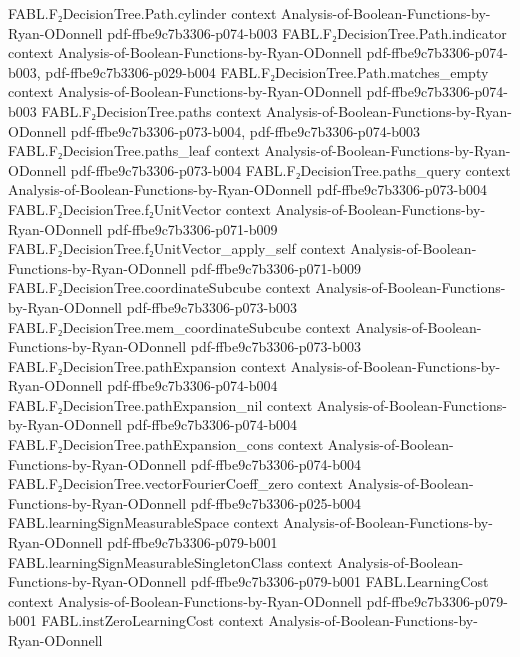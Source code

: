 \begin{theorem}
\proofstep
  {FABL.F₂DecisionTree.Path.cylinder}
  {context}
  {Analysis-of-Boolean-Functions-by-Ryan-ODonnell}
  {pdf-ffbe9c7b3306-p074-b003}
\proofstep
  {FABL.F₂DecisionTree.Path.indicator}
  {context}
  {Analysis-of-Boolean-Functions-by-Ryan-ODonnell}
  {pdf-ffbe9c7b3306-p074-b003,
    pdf-ffbe9c7b3306-p029-b004}
\proofstep
  {FABL.F₂DecisionTree.Path.matches_empty}
  {context}
  {Analysis-of-Boolean-Functions-by-Ryan-ODonnell}
  {pdf-ffbe9c7b3306-p074-b003}
\proofstep
  {FABL.F₂DecisionTree.paths}
  {context}
  {Analysis-of-Boolean-Functions-by-Ryan-ODonnell}
  {pdf-ffbe9c7b3306-p073-b004,
    pdf-ffbe9c7b3306-p074-b003}
\proofstep
  {FABL.F₂DecisionTree.paths_leaf}
  {context}
  {Analysis-of-Boolean-Functions-by-Ryan-ODonnell}
  {pdf-ffbe9c7b3306-p073-b004}
\proofstep
  {FABL.F₂DecisionTree.paths_query}
  {context}
  {Analysis-of-Boolean-Functions-by-Ryan-ODonnell}
  {pdf-ffbe9c7b3306-p073-b004}
\proofstep
  {FABL.F₂DecisionTree.f₂UnitVector}
  {context}
  {Analysis-of-Boolean-Functions-by-Ryan-ODonnell}
  {pdf-ffbe9c7b3306-p071-b009}
\proofstep
  {FABL.F₂DecisionTree.f₂UnitVector_apply_self}
  {context}
  {Analysis-of-Boolean-Functions-by-Ryan-ODonnell}
  {pdf-ffbe9c7b3306-p071-b009}
\proofstep
  {FABL.F₂DecisionTree.coordinateSubcube}
  {context}
  {Analysis-of-Boolean-Functions-by-Ryan-ODonnell}
  {pdf-ffbe9c7b3306-p073-b003}
\proofstep
  {FABL.F₂DecisionTree.mem_coordinateSubcube}
  {context}
  {Analysis-of-Boolean-Functions-by-Ryan-ODonnell}
  {pdf-ffbe9c7b3306-p073-b003}
\proofstep
  {FABL.F₂DecisionTree.pathExpansion}
  {context}
  {Analysis-of-Boolean-Functions-by-Ryan-ODonnell}
  {pdf-ffbe9c7b3306-p074-b004}
\proofstep
  {FABL.F₂DecisionTree.pathExpansion_nil}
  {context}
  {Analysis-of-Boolean-Functions-by-Ryan-ODonnell}
  {pdf-ffbe9c7b3306-p074-b004}
\proofstep
  {FABL.F₂DecisionTree.pathExpansion_cons}
  {context}
  {Analysis-of-Boolean-Functions-by-Ryan-ODonnell}
  {pdf-ffbe9c7b3306-p074-b004}
\proofstep
  {FABL.F₂DecisionTree.vectorFourierCoeff_zero}
  {context}
  {Analysis-of-Boolean-Functions-by-Ryan-ODonnell}
  {pdf-ffbe9c7b3306-p025-b004}
\proofstep
  {FABL.learningSignMeasurableSpace}
  {context}
  {Analysis-of-Boolean-Functions-by-Ryan-ODonnell}
  {pdf-ffbe9c7b3306-p079-b001}
\proofstep
  {FABL.learningSignMeasurableSingletonClass}
  {context}
  {Analysis-of-Boolean-Functions-by-Ryan-ODonnell}
  {pdf-ffbe9c7b3306-p079-b001}
\proofstep
  {FABL.LearningCost}
  {context}
  {Analysis-of-Boolean-Functions-by-Ryan-ODonnell}
  {pdf-ffbe9c7b3306-p079-b001}
\proofstep
  {FABL.instZeroLearningCost}
  {context}
  {Analysis-of-Boolean-Functions-by-Ryan-ODonnell}

\end{theorem}
